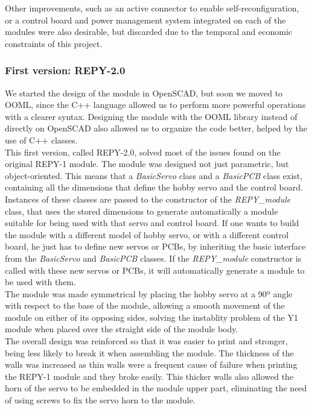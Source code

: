 Other improvements, such as an active connector to enable self-reconfiguration, or a control board and power management system integrated on each of the modules were also desirable, but discarded due to the temporal and economic constraints of this project.

\subsubsection{First version: REPY-2.0}
We started the design of the module in OpenSCAD, but soon we moved to OOML, since the C++ language allowed us to perform more powerful operations with a clearer syntax. Designing the module with the OOML library instead of directly on OpenSCAD also allowed us to organize the code better, helped by the use of C++ classes.\\

This first version, called REPY-2.0, solved most of the issues found on the original REPY-1 module. The module was designed not just parametric, but object-oriented. This means that a \emph{BasicServo} class and a \emph{BasicPCB} class exist, containing all the dimensions that define the hobby servo and the control board. Instances of these classes are passed to the constructor of the \emph{REPY\_module} class, that uses the stored dimensions to generate automatically a module suitable for being used with that servo and control board. If one wants to build the module with a different model of hobby servo, or with a different control board, he just has to define new servos or PCBs, by inheriting the basic interface from the \emph{BasicServo} and \emph{BasicPCB} classes. If the \emph{REPY\_module} constructor is called with these new servos or PCBs, it will automatically generate a module to be used with them.\\

The module was made symmetrical by placing the hobby servo at a 90º angle with respect to the base of the module, allowing a smooth movement of the module on either of its opposing sides, solving the instablity problem of the Y1 module when placed over the straight side of the module body.\\

The overall design was reinforced so that it was easier to print and stronger, being less likely to break it when assembling the module. The thickness of the walls was increased as thin walls were a frequent cause of failure when printing the REPY-1 module and they broke easily. This thicker walls also allowed the horn of the servo to be embedded in the module upper part,  eliminating the need of using screws to fix the servo horn to the module.\\

